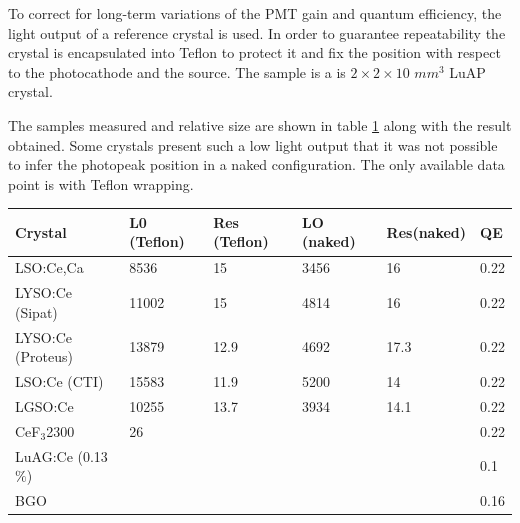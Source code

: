 To correct for long-term variations of the PMT gain and quantum efficiency, the light output of a reference crystal is used. In order to guarantee repeatability the crystal is encapsulated into Teflon to protect it and fix the position with respect to the photocathode and the source. The sample is a is $2\times 2\times 10$ $mm^{3}$ LuAP crystal.

The samples measured and relative size are shown in table \ref{table:LYtable} along with the result obtained. Some crystals present such a low light output that it was not possible to infer the photopeak position in a naked configuration. The only available data point is with Teflon wrapping.
\begin{table}[h]
\begin{center}
\begin{tabular}{|l|l|l|l|l|l|}
\hline
Crystal  & L0 (Teflon) & Res (Teflon) & LO (naked) &  Res(naked) & QE\\
\hline
LSO:Ce,Ca& 8536&15 & 3456&16 &0.22\\
\hline
LYSO:Ce (Sipat)&11002 &15 &4814 &16&0.22\\
\hline
LYSO:Ce (Proteus)& 13879& 12.9 & 4692& 17.3&0.22\\
\hline
LSO:Ce (CTI)&15583 &11.9 &5200 &14&0.22\\
\hline
LGSO:Ce & 10255&13.7 &3934 &14.1&0.22\\
\hline
CeF$_{3}$2300&26 & & & &0.22\\
\hline
LuAG:Ce (0.13$\%$)& & & & &0.1\\
\hline
BGO& & & & &0.16\\
\hline
\end{tabular}
\end{center}
\label{table:LYtable}
\end{table}

